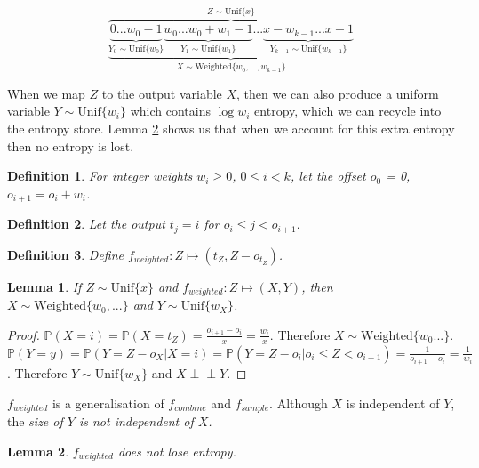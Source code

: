 \documentclass[lettersize,journal]{IEEEtran}
\newtheorem{lemma}{Lemma}
\newtheorem{definition}{Definition}
\newcommand{\indep}{\perp\!\!\!\perp}
\newcommand{\unif}[1]{\mathrm{Unif}\{#1\}}
\newcommand{\Prob}{\mathbb{P}}
\newcommand{\prob}[1]{\Prob(#1)}
\begin{document}
\[
\overbrace{
    \underbrace{
        \underbrace{0 ... w_0-1}_{Y_0 \sim \unif{w_0}}
          \underbrace{w_0 ... w_0+w_1-1}_{Y_1 \sim \unif{w_1}}
          ...
          \underbrace{
             x-w_{k-1} ... 
             x-1
         }_{Y_{k-1} \sim \unif{w_{k-1}}}
    }_{X \sim \mathrm{Weighted}\{w_0, ..., w_{k-1}\}}
}^{Z \sim \unif{x}}
\]

When we map $Z$ to the output variable $X$, then we can also produce a uniform variable $Y \sim \unif{w_i}$ which contains $\log w_i$ entropy, which we can recycle into the entropy store. Lemma \ref{lem:distribution-conservation} shows us that when we account for this extra entropy then no entropy is lost.

\begin{definition}
    \label{def:o}
    For integer weights $w_i \ge 0$, $0 \le i < k$, let the offset $o_0$ = 0, $o_{i+1} = o_i + w_i$.
\end{definition}

\begin{definition}
    \label{def:t}
    Let the output $t_j = i$ for $o_i \le j < o_{i+1}.$
\end{definition}

\begin{definition}
    Define $f_{weighted}: Z \mapsto (t_Z, Z-o_{t_Z})$.
\end{definition}

\begin{lemma}
    If $Z \sim \unif{x}$ and $f_{weighted}: Z \mapsto (X, Y)$, then $X \sim \mathrm{Weighted}\{w_0, ...\}$ and $Y \sim \unif{w_X}$.
\end{lemma}

\begin{proof}
    $\prob{X=i} = \prob{X = t_Z} = \frac{o_{i+1} - o_i}{x} = \frac{w_i}{x}$. Therefore $X \sim \mathrm{Weighted}\{w_0 ...\}$.  $\prob{Y=y} = \prob{Y = Z - o_X | X = i} = \prob{Y = Z - o_i | o_{i} \le Z < o_{i+1}} = \frac{1}{o_{i+1}-o_i} = \frac{1}{w_i}$. Therefore $Y \sim \unif{w_X}$ and $X \indep Y$.
\end{proof}

$f_{weighted}$ is a generalisation of $f_{combine}$ and $f_{sample}$. Although $X$ is independent of $Y$, the \em size \em of $Y$ is not independent of $X$.

\begin{lemma}
    \label{lem:distribution-conservation}
    $f_{weighted}$ does not lose entropy.
\end{lemma}
\end{document}
